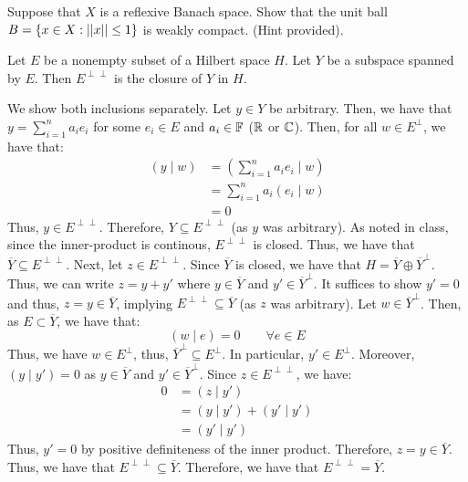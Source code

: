 \documentclass[12pt]{article}
\begin{document}


\begin{problem}{54}
    Suppose that $X$ is a reflexive Banach space. Show that the unit ball $B = \{x \in X: \left\vert\left\vert x\right\vert\right\vert \leq 1\}$ is weakly compact. (Hint provided). 

\end{problem}
\begin{solution}
\end{solution}
\newpage

\begin{problem}{59}
    Let $E$ be a nonempty subset of a Hilbert space $H$. Let $Y$ be a subspace spanned by $E$. Then $E^{\perp\perp}$ is the closure of $Y$ in $H$.
\end{problem}
\begin{solution}
    We show both inclusions separately. \bbni
    Let $y \in Y$ be arbitrary. Then, we have that $y = \sum_{i=1}^n a_i e_i$ for some $e_i \in E$ and $a_i \in \mathbb F$ ($\mathbb R$ or $\mathbb C$). Then, for all $w \in E^\perp$, we have that: 
    \begin{align*}
        (y \mid w) &= \left(\sum_{i=1}^n a_i e_i \mid w\right) \\
        &= \sum_{i=1}^n a_i (e_i \mid w) \\
        &= 0
    \end{align*}
    Thus, $y \in E^{\perp\perp}$. Therefore, $Y \subseteq E^{\perp\perp}$ (as $y$ was arbitrary). As noted in class, since the inner-product is continous, $E^{\perp\perp}$ is closed. Thus, we have that $\overline{Y} \subseteq E^{\perp\perp}$. \bbni
    Next, let $z \in E^{\perp\perp}$. Since $\overline{Y}$ is closed, we have that $H = \overline{Y} \oplus \overline{Y}^\perp$. Thus, we can write $z = y + y'$ where $y \in \overline{Y}$ and $y' \in \overline{Y}^\perp$. It suffices to show $y' = 0$ and thus, $z = y \in \overline{Y}$, implying $E^{\perp\perp} \subseteq \overline{Y}$ (as $z$ was arbitrary). \bbni
    Let $w \in \overline{Y}^\perp$. Then, as $E \subset \overline{Y}$, we have that:
    \[ (w \mid e) = 0 \qquad \forall e \in E\] 
    Thus, we have $w \in E^\perp$, thus, $\overline{Y}^\perp \subseteq E^\perp$. In particular, $y' \in E^\perp$. Moreover, $(y \mid y') = 0$ as $y \in \overline{Y}$ and $y' \in \overline{Y}^\perp$. Since $z \in E^{\perp\perp}$, we have:
    \begin{align*}
        0 &= (z \mid y') \\
        &= (y \mid y') + (y' \mid y') \\
        &= (y' \mid y')
    \end{align*} 
    Thus, $y' = 0$ by positive definiteness of the inner product. Therefore, $z = y \in \overline{Y}$. Thus, we have that $E^{\perp\perp} \subseteq \overline{Y}$. \bbni
    Therefore, we have that $E^{\perp\perp} = \overline{Y}$.
\end{solution}
\newpage
\end{document}
